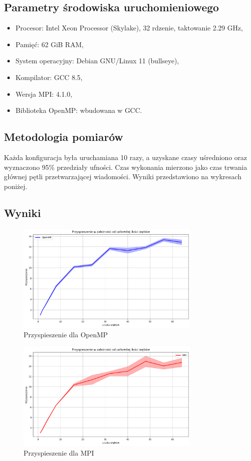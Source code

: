 \documentclass[a4paper,12pt]{article}
\begin{document}
\subsection{Parametry środowiska uruchomieniowego}
\begin{itemize}
	\item Procesor: Intel Xeon Processor (Skylake), 32 rdzenie, taktowanie 2.29 GHz,
	\item Pamięć: 62 GiB RAM,
	\item System operacyjny: Debian GNU/Linux 11 (bullseye),
	\item Kompilator: GCC 8.5,
	\item Wersja MPI: 4.1.0,
	\item Biblioteka OpenMP: wbudowana w GCC.
\end{itemize}

\subsection{Metodologia pomiarów}
Każda konfiguracja była uruchamiana 10 razy, a uzyskane czasy uśredniono oraz wyznaczono 95\% przedziały ufności. Czas wykonania mierzono jako czas trwania głównej pętli przetwarzającej wiadomości. Wyniki przedstawiono na wykresach poniżej.

\subsection{Wyniki}
\begin{figure}[h!]
	\centering
	\includegraphics[width=0.8\textwidth]{openmp.png}
	\caption{Przyspieszenie dla OpenMP}
	\label{fig:openmp}
\end{figure}

\begin{figure}[h!]
	\centering
	\includegraphics[width=0.8\textwidth]{mpi.png}
	\caption{Przyspieszenie dla MPI}
	\label{fig:mpi}
\end{figure}
\end{document}
